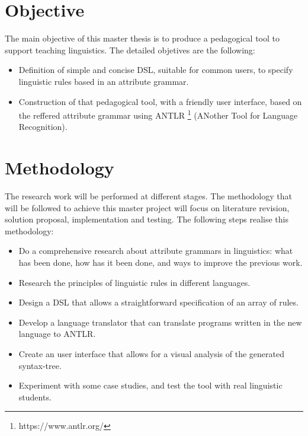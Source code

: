 	
\section{Objective}
The main objective of this master thesis is to produce a pedagogical tool to support teaching linguistics. The detailed objetives are the following:

\begin{itemize}
    \item Definition of simple and concise \textsc{DSL}, suitable for common users, to specify linguistic rules based in an attribute grammar.
    \item Construction of that pedagogical tool, with a friendly user interface, based on the reffered attribute grammar using \textsc{ANTLR} \footnote{https://www.antlr.org/} (ANother Tool for Language Recognition).
\end{itemize}
    
\section{Methodology}
The research work will be performed at different stages. The methodology that will be followed to achieve this master project will focus on literature revision, solution proposal, implementation and testing. The following steps realise this methodology:

\begin{itemize}
    \item Do a comprehensive research about attribute grammars in linguistics: what has been done, how has it been done, and ways to improve the previous work.
    \item Research the principles of linguistic rules in different languages.
    \item Design a \textsc{DSL} that allows a straightforward specification of an array of rules.
    \item Develop a language translator that can translate programs written in the new language to \textsc{ANTLR}.
    \item Create an user interface that allows for a visual analysis of the generated syntax-tree.
    \item Experiment with some case studies, and test the tool with real linguistic students.
\end{itemize}
    
